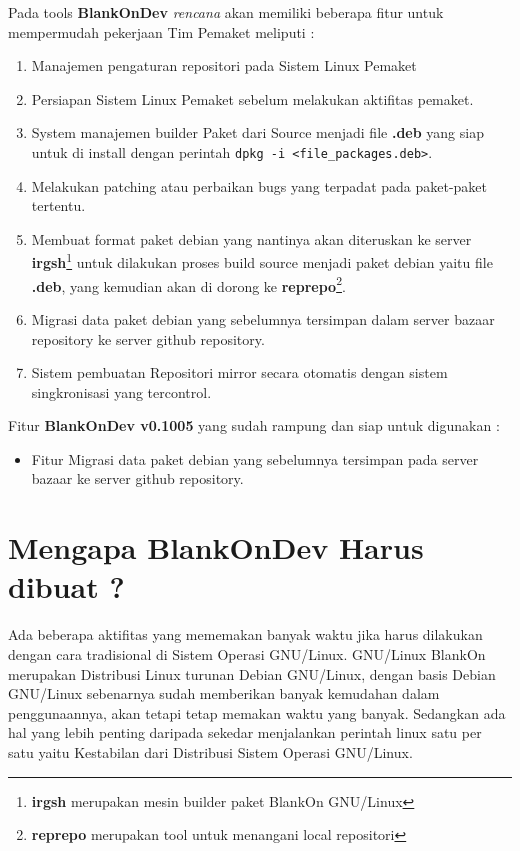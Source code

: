 \noindent
Pada tools \textbf{BlankOnDev} \textit{rencana} akan memiliki beberapa fitur untuk mempermudah pekerjaan Tim Pemaket meliputi :
\begin{enumerate}
	\item Manajemen pengaturan repositori pada Sistem Linux Pemaket
	
	\item Persiapan Sistem Linux Pemaket sebelum melakukan aktifitas pemaket.
	
	\item System manajemen builder Paket dari Source menjadi file \textbf{.deb} yang siap untuk di install dengan perintah \texttt{dpkg -i <file\_packages.deb>}.
	
	\item Melakukan patching atau perbaikan bugs yang terpadat pada paket-paket tertentu.
	
	\item Membuat format paket debian yang nantinya akan diteruskan ke server \textbf{irgsh}\footnote{\textbf{irgsh} merupakan mesin builder paket BlankOn GNU/Linux} untuk dilakukan proses build source menjadi paket debian yaitu file \textbf{.deb}, yang kemudian akan di dorong ke \textbf{reprepo}\footnote{\textbf{reprepo} merupakan tool untuk menangani local repositori}.
	
	\item Migrasi data paket debian yang sebelumnya tersimpan dalam server bazaar repository ke server github repository.
	
	\item Sistem pembuatan Repositori mirror secara otomatis dengan sistem singkronisasi yang tercontrol.
\end{enumerate}

\noindent
Fitur \textbf{BlankOnDev v0.1005} yang sudah rampung dan siap untuk digunakan :
\begin{itemize}
	\item Fitur Migrasi data paket debian yang sebelumnya tersimpan pada server bazaar ke server github repository.
\end{itemize}

\section{Mengapa BlankOnDev Harus dibuat ?}\label{sec:why}
\noindent
Ada beberapa aktifitas yang mememakan banyak waktu jika harus dilakukan dengan cara tradisional di Sistem Operasi GNU/Linux. GNU/Linux BlankOn merupakan Distribusi Linux turunan Debian GNU/Linux, dengan basis Debian GNU/Linux sebenarnya sudah memberikan banyak kemudahan dalam penggunaannya, akan tetapi tetap memakan waktu yang banyak. Sedangkan ada hal yang lebih penting daripada sekedar menjalankan perintah linux satu per satu yaitu Kestabilan dari Distribusi Sistem Operasi GNU/Linux. 

